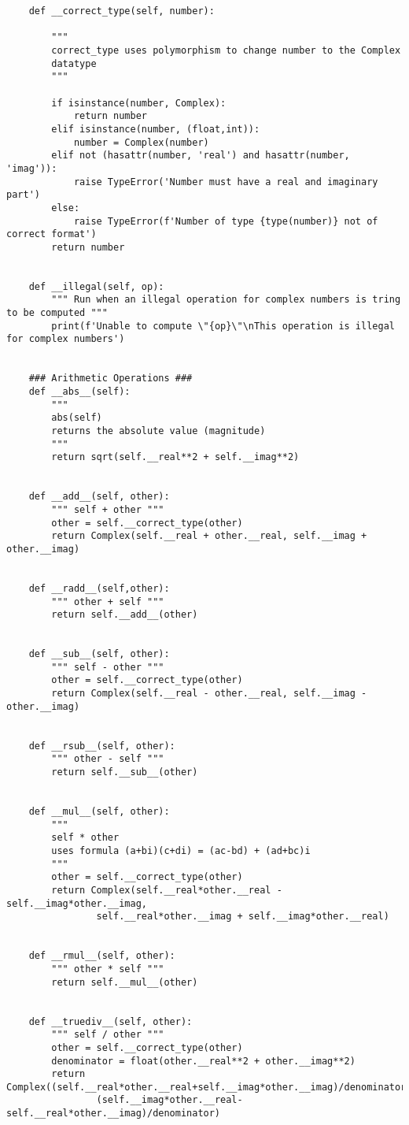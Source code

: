 \documentclass{article}
\begin{document}
\begin{lstlisting}
    def __correct_type(self, number):

        """
        correct_type uses polymorphism to change number to the Complex
        datatype
        """

        if isinstance(number, Complex):
            return number
        elif isinstance(number, (float,int)):
            number = Complex(number)
        elif not (hasattr(number, 'real') and hasattr(number, 'imag')):
            raise TypeError('Number must have a real and imaginary part')
        else:
            raise TypeError(f'Number of type {type(number)} not of correct format')
        return number


    def __illegal(self, op):
        """ Run when an illegal operation for complex numbers is tring to be computed """
        print(f'Unable to compute \"{op}\"\nThis operation is illegal for complex numbers')


    ### Arithmetic Operations ###
    def __abs__(self):
        """
        abs(self)
        returns the absolute value (magnitude)
        """
        return sqrt(self.__real**2 + self.__imag**2)


    def __add__(self, other):
        """ self + other """
        other = self.__correct_type(other)
        return Complex(self.__real + other.__real, self.__imag + other.__imag)


    def __radd__(self,other):
        """ other + self """
        return self.__add__(other)


    def __sub__(self, other):
        """ self - other """
        other = self.__correct_type(other)
        return Complex(self.__real - other.__real, self.__imag - other.__imag)


    def __rsub__(self, other):
        """ other - self """
        return self.__sub__(other)


    def __mul__(self, other):
        """
        self * other
        uses formula (a+bi)(c+di) = (ac-bd) + (ad+bc)i
        """
        other = self.__correct_type(other)
        return Complex(self.__real*other.__real - self.__imag*other.__imag,
                self.__real*other.__imag + self.__imag*other.__real)


    def __rmul__(self, other):
        """ other * self """
        return self.__mul__(other)


    def __truediv__(self, other):
        """ self / other """
        other = self.__correct_type(other)
        denominator = float(other.__real**2 + other.__imag**2)
        return Complex((self.__real*other.__real+self.__imag*other.__imag)/denominator,
                (self.__imag*other.__real-self.__real*other.__imag)/denominator)



\end{lstlisting}
\end{document}
